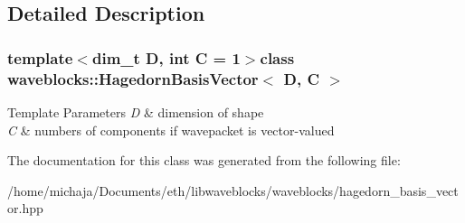 \subsection{Detailed Description}
\subsubsection*{template$<$dim\+\_\+t D, int C = 1$>$class waveblocks\+::\+Hagedorn\+Basis\+Vector$<$ D, C $>$}


\begin{DoxyTemplParams}{Template Parameters}
{\em D} & dimension of shape \\
\hline
{\em C} & numbers of components if wavepacket is vector-\/valued \\
\hline
\end{DoxyTemplParams}


The documentation for this class was generated from the following file\+:\begin{DoxyCompactItemize}
\item 
/home/michaja/\+Documents/eth/libwaveblocks/waveblocks/hagedorn\+\_\+basis\+\_\+vector.\+hpp\end{DoxyCompactItemize}
